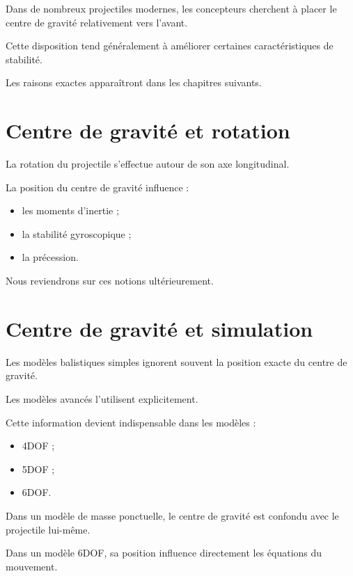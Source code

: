 Dans de nombreux projectiles modernes, les concepteurs cherchent à placer le
centre de gravité relativement vers l'avant.

Cette disposition tend généralement à améliorer certaines caractéristiques
de stabilité.

Les raisons exactes apparaîtront dans les chapitres suivants.

\section{Centre de gravité et rotation}

La rotation du projectile s'effectue autour de son axe longitudinal.

La position du centre de gravité influence :

\begin{itemize}
    \item les moments d'inertie ;
    \item la stabilité gyroscopique ;
    \item la précession.
\end{itemize}

Nous reviendrons sur ces notions ultérieurement.

\section{Centre de gravité et simulation}

Les modèles balistiques simples ignorent souvent la position exacte du centre
de gravité.

Les modèles avancés l'utilisent explicitement.

Cette information devient indispensable dans les modèles :

\begin{itemize}
    \item 4DOF ;
    \item 5DOF ;
    \item 6DOF.
\end{itemize}

\begin{simulation}

Dans un modèle de masse ponctuelle, le centre de gravité est confondu avec
le projectile lui-même.

Dans un modèle 6DOF, sa position influence directement les équations du
mouvement.

\end{simulation}

